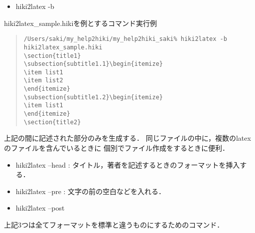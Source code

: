 \begin{itemize}
\item hiki2latex -b
\end{itemize}
hiki2latex\_sample.hikiを例とするコマンド実行例
\begin{quote}\begin{verbatim}
/Users/saki/my_help2hiki/my_help2hiki_saki% hiki2latex -b hiki2latex_sample.hiki
\section{title1}
\subsection{subtitle1.1}\begin{itemize}
\item list1
\item list2
\end{itemize}
\subsection{subtitle1.2}\begin{itemize}
\item list1
\end{itemize}
\section{title2}
\end{verbatim}\end{quote}
上記の間に記述された部分のみを生成する．
同じファイルの中に，複数のlatexのファイルを含んでいるときに
個別でファイル作成をするときに便利．

\begin{itemize}
\item hiki2latex --head : タイトル，著者を記述するときのフォーマットを挿入する．
\item hiki2latex --pre : 文字の前の空白などを入れる．
\item hiki2latex --post
\end{itemize}
上記3つは全てフォーマットを標準と違うものにするためのコマンド．

